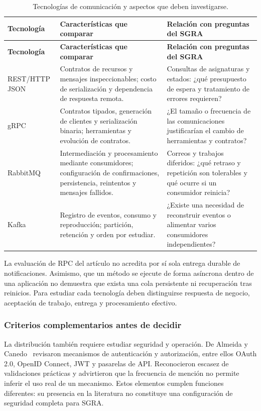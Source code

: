 \begingroup
\small\setlength{\tabcolsep}{4pt}\renewcommand{\arraystretch}{1.12}
\begin{longtable}{@{}p{}p{}p{}@{}}
\caption{Tecnologías de comunicación y aspectos que deben investigarse.}\\
\toprule\textbf{Tecnología}&\textbf{Características que comparar}&\textbf{Relación con preguntas del SGRA}\\\midrule\endfirsthead
\toprule\textbf{Tecnología}&\textbf{Características que comparar}&\textbf{Relación con preguntas del SGRA}\\\midrule\endhead
REST/HTTP JSON & Contratos de recursos y mensajes inspeccionables; costo de serialización y dependencia de respuesta remota. & Consultas de asignaturas y estados: ¿qué presupuesto de espera y tratamiento de errores requieren?\\\midrule
gRPC & Contratos tipados, generación de clientes y serialización binaria; herramientas y evolución de contratos. & ¿El tamaño o frecuencia de las comunicaciones justificarían el cambio de herramientas y contratos?\\\midrule
RabbitMQ & Intermediación y procesamiento mediante consumidores; configuración de confirmaciones, persistencia, reintentos y mensajes fallidos. & Correos y trabajos diferidos: ¿qué retraso y repetición son tolerables y qué ocurre si un consumidor reinicia?\\\midrule
Kafka & Registro de eventos, consumo y reproducción; partición, retención y orden por estudiar. & ¿Existe una necesidad de reconstruir eventos o alimentar varios consumidores independientes?\\
\bottomrule
\end{longtable}
\endgroup

La evaluación de RPC del artículo no acredita por sí sola entrega durable de notificaciones. Asimismo, que un método se ejecute de forma asíncrona dentro de una aplicación no demuestra que exista una cola persistente ni recuperación tras reinicios. Para estudiar cada tecnología deben distinguirse respuesta de negocio, aceptación de trabajo, entrega y procesamiento efectivo.

\subsubsection{Criterios complementarios antes de decidir}
La distribución también requiere estudiar seguridad y operación. De Almeida y Canedo~\cite{almeida2022-authentication} revisaron mecanismos de autenticación y autorización, entre ellos OAuth 2.0, OpenID Connect, JWT y pasarelas de API. Reconocieron escasez de validaciones prácticas y advirtieron que la frecuencia de mención no permite inferir el uso real de un mecanismo. Estos elementos cumplen funciones diferentes: su presencia en la literatura no constituye una configuración de seguridad completa para SGRA.

